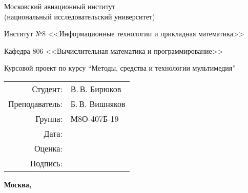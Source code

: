 \begin{titlepage}
\begin{center}
\bfseries

{\Large Московский авиационный институт\\ (национальный исследовательский университет)

}

\vspace{48pt}

{\large Институт №8 <<Информационные технологии и прикладная математика>>
}

\vspace{36pt}

{\large Кафедра 806 <<Вычислительная математика и программирование>>

}


\vspace{48pt}

Курсовой проект по курсу \enquote{Методы, средства и технологии мультимедия}

\end{center}

\vspace{120pt}

\begin{flushright}
\begin{tabular}{rl}
Студент: & В.\,В. Бирюков \\
Преподаватель: & Б.\,В. Вишняков \\
Группа: & М8О-407Б-19 \\
Дата: & \\
Оценка: & \\
Подпись: & \\
\end{tabular}
\end{flushright}

\vfill

\begin{center}
\bfseries
Москва, \the\year
\end{center}
\end{titlepage}

\pagebreak
